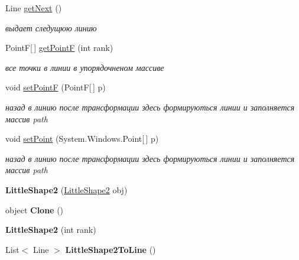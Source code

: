 \begin{DoxyCompactItemize}
\item 
Line \hyperlink{classtwelve_1_1_little_shape2_a4e04d0b57510f81ad69ef08e3ff80cce}{get\+Next} ()
\begin{DoxyCompactList}\small\item\em выдает следущюю линию \end{DoxyCompactList}\item 
Point\+F\mbox{[}$\,$\mbox{]} \hyperlink{classtwelve_1_1_little_shape2_a2b550148d37609328d78675f889395c1}{get\+Point\+F} (int rank)
\begin{DoxyCompactList}\small\item\em все точки в линии в упорядочненом массиве \end{DoxyCompactList}\item 
void \hyperlink{classtwelve_1_1_little_shape2_a5afd47e1b0b02f81975fdfc02ea0f030}{set\+Point\+F} (Point\+F\mbox{[}$\,$\mbox{]} p)
\begin{DoxyCompactList}\small\item\em назад в линию после трансформации здесь формируються линии и заполняется массив path \end{DoxyCompactList}\item 
void \hyperlink{classtwelve_1_1_little_shape2_a411ae955923dc349d1af3f49fbeb4819}{set\+Point} (System.\+Windows.\+Point\mbox{[}$\,$\mbox{]} p)
\begin{DoxyCompactList}\small\item\em назад в линию после трансформации здесь формируються линии и заполняется массив path \end{DoxyCompactList}\item 
\hypertarget{classtwelve_1_1_little_shape2_afb70047b35b1ad735b1fd88058369070}{}{\bfseries Little\+Shape2} (\hyperlink{classtwelve_1_1_little_shape2}{Little\+Shape2} obj)\label{classtwelve_1_1_little_shape2_afb70047b35b1ad735b1fd88058369070}

\item 
\hypertarget{classtwelve_1_1_little_shape2_a8b8616a97eb813d9c238851a7ed8836d}{}object {\bfseries Clone} ()\label{classtwelve_1_1_little_shape2_a8b8616a97eb813d9c238851a7ed8836d}

\item 
\hypertarget{classtwelve_1_1_little_shape2_aa293d0130792d100e133222f3108b5dd}{}{\bfseries Little\+Shape2} (int rank)\label{classtwelve_1_1_little_shape2_aa293d0130792d100e133222f3108b5dd}

\item 
\hypertarget{classtwelve_1_1_little_shape2_a14ef91d221550e2ab454e013b9dc9b78}{}List$<$ Line $>$ {\bfseries Little\+Shape2\+To\+Line} ()\label{classtwelve_1_1_little_shape2_a14ef91d221550e2ab454e013b9dc9b78}

\end{DoxyCompactItemize}
